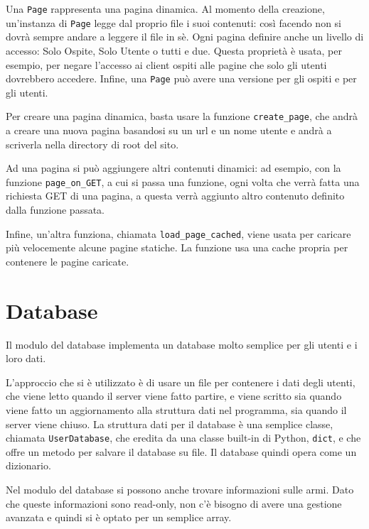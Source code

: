 \documentclass[a4paper,12pt]{report}
\begin{document}
Una \texttt{Page} rappresenta una pagina dinamica. Al momento della creazione, un'instanza di \texttt{Page} legge dal proprio file i suoi contenuti: così facendo non si dovrà sempre andare a leggere il file in sè. Ogni pagina definire anche un livello di accesso: Solo Ospite, Solo Utente o tutti e due. Questa proprietà è usata, per esempio, per negare l'accesso ai client ospiti alle pagine che solo gli utenti dovrebbero accedere. Infine, una \texttt{Page} può avere una versione per gli ospiti e per gli utenti.

Per creare una pagina dinamica, basta usare la funzione \texttt{create\_page}, che andrà a creare una nuova pagina basandosi su un url e un nome utente e andrà a scriverla nella directory di root del sito.

Ad una pagina si può aggiungere altri contenuti dinamici: ad esempio, con la funzione \texttt{page\_on\_GET}, a cui si passa una funzione, ogni volta che verrà fatta una richiesta GET di una pagina, a questa verrà aggiunto altro contenuto definito dalla funzione passata.

Infine, un'altra funziona, chiamata \texttt{load\_page\_cached}, viene usata per caricare più velocemente alcune pagine statiche. La funzione usa una cache propria per contenere le pagine caricate.

\section{Database}

Il modulo del database implementa un database molto semplice per gli utenti e i loro dati.

L'approccio che si è utilizzato è di usare un file per contenere i dati degli utenti, che viene letto quando il server viene fatto partire, e viene scritto sia quando viene fatto un aggiornamento alla struttura dati nel programma, sia quando il server viene chiuso. La struttura dati per il database è una semplice classe, chiamata \texttt{UserDatabase}, che eredita da una classe built-in di Python, \texttt{dict}, e che offre un metodo per salvare il database su file. Il database quindi opera come un dizionario.

Nel modulo del database si possono anche trovare informazioni sulle armi. Dato che queste informazioni sono read-only, non c'è bisogno di avere una gestione avanzata e quindi si è optato per un semplice array.
\end{document}
